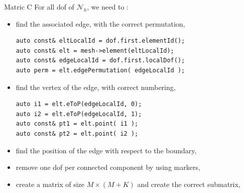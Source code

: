 \documentclass{beamer}
\newcommand{\NN}{{\bm{\mathcal{N}}}}
\begin{document}
\begin{frame}[fragile]{Matric C}
  For all dof of $\NN_h$, we need to :
  \begin{itemize}
  \item find the associated edge, with the correct permutation,
    \begin{lstlisting}
auto const& eltLocalId = dof.first.elementId();
auto const& elt = mesh->element(eltLocalId);
auto const& edgeLocalId = dof.first.localDof();
auto perm = elt.edgePermutation( edgeLocalId );
    \end{lstlisting}
  \item find the vertex of the edge, with correct numbering,
    \begin{lstlisting}
auto i1 = elt.eToP(edgeLocalId, 0);
auto i2 = elt.eToP(edgeLocalId, 1);
auto const& pt1 = elt.point( i1 );
auto const& pt2 = elt.point( i2 );
    \end{lstlisting}
  \item find the position of the edge with respect to the boundary,
  \item remove one dof per connected component by using markers,
  \item create a matrix of size $M\times(M+K)$ and create the correct submatrix,
  \end{itemize}
\end{frame}
\end{document}

